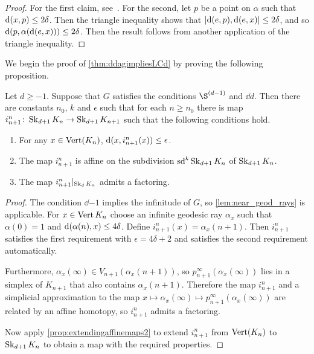 \documentclass[a4paper]{article}
\begin{document}
\begin{proof}
  For the first claim, see~\cite{bestvinamess91}. For the second, let $p$ be a 
  point on $\alpha$ such that $\operatorname{d}(x, p) \leq 2\delta$. Then the triangle 
  inequality shows that $\left|\operatorname{d}(e,p), \operatorname{d}(e,x)\right| \leq 2\delta$, and 
  so $\operatorname{d}(p, \alpha(\operatorname{d}(e,x))) \leq 2\delta$. Then the result 
  follows from another application of the triangle inequality.
\end{proof}

We begin the proof of \cref{thm:ddagimpliesLCd} by proving the following 
proposition.

\begin{proposition}\label{prop:ddag_implies_i}
  Let $d \geq -1$. Suppose that $G$ satisfies the conditions $\Sd{d-1}$ and
  $\dd{d}$. Then there are constants $n_0$, $k$ and $\epsilon$ such that for
  each $n\geq n_0$ there is map $i^n_{n+1}\colon\operatorname{Sk}_{d+1} K_n \to \operatorname{Sk}_{d+1}
  K_{n+1}$ such that the following conditions hold.
  \begin{enumerate}
    \item For any $x \in \operatorname{Vert}(K_n)$, $\operatorname{d}(x, i_{n+1}^n(x)) \leq
      \epsilon$.
    \item The map $i^n_{n+1}$ is affine on the subdivision $\operatorname{sd}^k\operatorname{Sk}_{d+1}
      K_n$ of $\operatorname{Sk}_{d+1}K_n$.
    \item The map $i^n_{n+1}\vert_{\operatorname{Sk}_d K_n}$ admits a factoring.
  \end{enumerate}
\end{proposition}

\begin{proof}
  The condition $\dd{-1}$ implies the infinitude of $G$, so
  \cref{lem:near_geod_rays} is applicable. For $x \in \operatorname{Vert}{K_n}$ choose an
  infinite geodesic ray $\alpha_x$ such that $\alpha(0) = 1$ and
  $\operatorname{d}(\alpha(n), x) \leq 4\delta$. Define $i^n_{n+1}(x) =
  \alpha_x(n+1)$. Then $i^n_{n+1}$ satisfies the first requirement with
  $\epsilon = 4\delta+2$ and satisfies the second requirement automatically.

  Furthermore, $\alpha_x(\infty) \in V_{n+1}(\alpha_x(n+1))$, so 
  $p^\infty_{n+1}(\alpha_x(\infty))$ lies in a simplex of $K_{n+1}$ that also 
  contains $\alpha_x(n+1)$.  Therefore the map $i^n_{n+1}$ and a simplicial 
  approximation to the map $x \mapsto \alpha_x(\infty) \mapsto p^\infty_{n+1} 
  (\alpha_x(\infty))$ are related by an affine homotopy, so $i^n_{n+1}$ admits a 
  factoring. 

  Now apply \cref{prop:extendingaffinemaps2} to extend $i^n_{n+1}$ from
  $\operatorname{Vert}(K_n)$ to $\operatorname{Sk}_{d+1} K_n$ to obtain a map with the required
  properties.
\end{proof}
\end{document}
